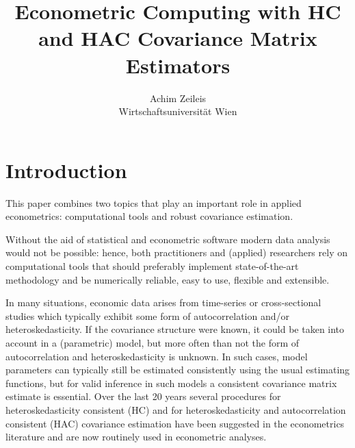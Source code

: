 \documentclass{Z}
\author{Achim Zeileis\\Wirtschaftsuniversit\"at Wien}
\title{Econometric Computing with HC and HAC Covariance Matrix Estimators}
\begin{document}



\section{Introduction} \label{sec:intro}

This paper combines two topics that play an important role in 
applied econometrics: computational tools and robust covariance
estimation.

Without the aid of statistical and econometric software
modern data analysis would not be possible: hence, both practitioners
and (applied) researchers rely on computational tools that should 
preferably implement state-of-the-art methodology and be numerically reliable,
easy to use, flexible and extensible. 

In many situations, economic data arises from time-series or cross-sectional
studies which typically exhibit some form of autocorrelation and/or heteroskedasticity.
If the covariance structure were known, it could be taken into account in
a (parametric) model, but more often than not the form of autocorrelation
and heteroskedasticity is unknown. In such cases, model parameters can typically
still be estimated consistently using the usual estimating functions, but for
valid inference in such models a consistent covariance matrix estimate is essential.
Over the last 20 years several procedures for heteroskedasticity consistent (HC)
and for heteroskedasticity and autocorrelation consistent (HAC) covariance estimation
have been suggested in the econometrics literature
\citep[among others]{hac:White:1980,hac:MacKinnon+White:1985,hac:Newey+West:1987,hac:Newey+West:1994,hac:Andrews:1991}
and are now routinely used in econometric analyses.
\end{document}
